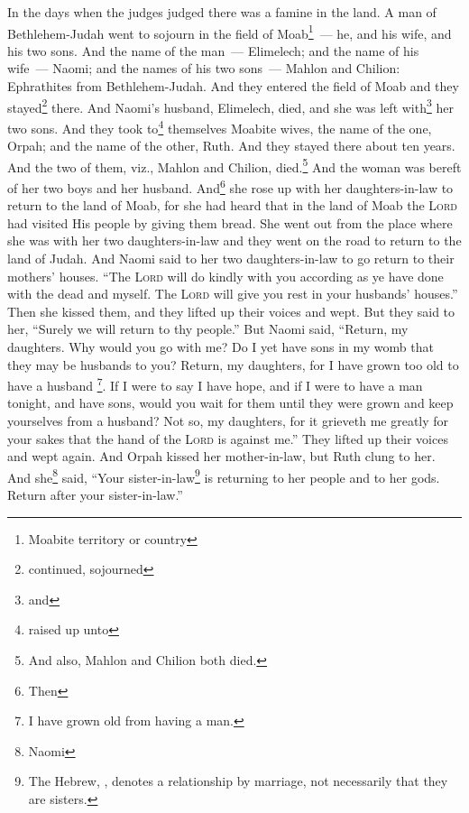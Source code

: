 
\begin{enumerate*}[mode=unboxed]
     In the days when the judges judged there was a famine in the land. A man of Bethlehem-Judah went to sojourn in the field of Moab\footnote{Moabite territory or country}~--- he, and his wife, and his two sons.%
     And the name of the man~--- Elimelech; and the name of his wife~--- Naomi; and the names of his two sons~--- Mahlon and Chilion: Ephrathites from Bethlehem-Judah. And they entered the field of Moab and they stayed\footnote{continued, sojourned} there.%
     And Naomi's husband, Elimelech, died, and she was left with\footnote{and} her two sons.%
     And they took to\footnote{raised up unto} themselves Moabite wives, the name of the one, Orpah; and the name of the other, Ruth. And they stayed there about ten years.%
     And the two of them, viz., Mahlon and Chilion, died.\footnote{ And also, Mahlon and Chilion both died.} And the woman was bereft of her two boys and her husband.%
     And\footnote{Then} she rose up with her daughters-in-law to return to the land of Moab, for she had heard that in the land of Moab the \textsc{Lord} had visited His people by giving them bread.%
     She went out from the place where she was with her two daughters-in-law and they went on the road to return to the land of Judah.%
     And Naomi said to her two daughters-in-law to go return to their mothers' houses. ``The \textsc{Lord} will do kindly with you according as ye have done with the dead and myself.%
     The \textsc{Lord} will give you rest in your husbands' houses.'' Then she kissed them, and they lifted up their voices and wept.%
     But they said to her, ``Surely we will return to thy people.''%
     But Naomi said, ``Return, my daughters. Why would you go with me? Do I yet have sons in my womb that they may be husbands to you?%
     Return, my daughters, for I have grown too old to have a husband \footnote{I have grown old from having a man.}. If I were to say I have hope, and if I were to have a man tonight, and have sons,%
     would you wait for them until they were grown and keep yourselves from a husband? Not so, my daughters, for it grieveth me greatly for your sakes that the hand of the \textsc{Lord} is against me.''%
     They lifted up their voices and wept again. And Orpah kissed her mother-in-law, but Ruth clung to her.%
     And she\footnote{Naomi} said, ``Your sister-in-law\footnote{The Hebrew, , denotes a relationship by marriage, not necessarily that they are sisters.} is returning to her people and to her gods. Return after your sister-in-law.''%

\end{enumerate*}
